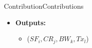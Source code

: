 \begin{frame}{Contribution}{Contributions}
\begin{itemize}
		\item \textbf{Outputs:}
		\begin{itemize}
			\item ($SF_{i}, CR_{j}, BW_{k}, Tx_{l}$)
		\end{itemize}
	\end{itemize}
\end{frame}




